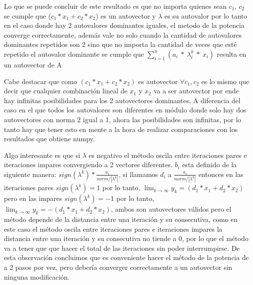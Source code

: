 Lo que se puede concluir de este resultado es que no importa quienes sean $c_1$, $c_2$ se cumple que ($c_1 * x_1 + c_2 * x_2$) es un autovector y $\lambda$ es su autovalor por lo tanto en el caso donde hay 2 autovalores dominantes iguales, el metodo de la potencia converge correctamente, además vale no solo cuando la cantidad de autovalores dominantes repetidos son 2 sino que no importa la cantidad de veces que esté repetido el autovalor dominante se cumple que $\sum_{i=1}^{n} (a_i \ * \ \lambda_{i}^{k} \ * \ x_i)$ resulta en un autovector de A

\vspace{1em}

Cabe destacar que como $(c_1 * x_1 + c_2 * x_2)$ es autovector $\forall c_1, c_2$ es lo mismo que decir que cualquier combinación lineal de $x_1$ y $x_2$ va a ser autovector por ende hay infinitas posibilidades para los 2 autovectores dominantes. A diferencia del caso en el que todos los autovalores son diferentes en módulo donde solo hay dos autovectores con norma 2 igual a 1, ahora las posibilidades son infinitas, por lo tanto hay que tener esto en mente a la hora de realizar comparaciones con los resultados que obtiene numpy. 

\vspace{1em}

Algo interesante es que si $\lambda$ es negativo el método oscila entre iteraciones pares e iteraciones impares convergiendo a 2 vectores diferentes. $b_i$ esta definido de la siguiente manera: $sign(\lambda^{k}) * \frac{a_i}{norm / |\lambda^{k}|}$, si llamamos $d_i$ a $\frac{a_i}{norm / |\lambda^{k}|}$ entonces en las iteraciones pares $sign(\lambda^{k}) = 1$ por lo tanto, $\lim_{k \to \infty} y_k = (d_1 * x_1 + d_2 * x_2)$ pero en las impares $sign(\lambda^{k}) = -1$ por lo tanto, $\lim_{k \to \infty} y_k = -(d_1 * x_1 + d_2 * x_2)$, ambos son autovectores válidos pero el método depende de la distancia entre una iteración y su consecutiva, como en este caso el método oscila entre iteraciones pares e iteraciones impares la distancia entre una iteración y su consecutiva no tiende a 0, por lo que el método va a tener que que hacer el total de las iteraciones sin poder interrumpirse. De esta observación concluimos que es conveniente hacer el método de la potencia de a 2 pasos por vez, pero debería converger correctamente a un autovector sin ninguna modificación.


